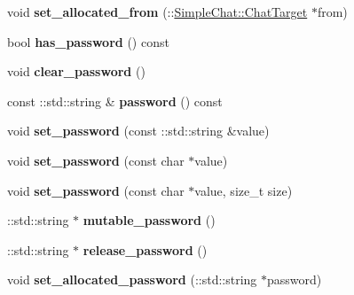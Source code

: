 \begin{DoxyCompactItemize}
\item 
\hypertarget{classSimpleChat_1_1ChatAuthorize_a6fbbc89d79068159644f157b15eeaa37}{void {\bfseries set\-\_\-allocated\-\_\-from} (\-::\hyperlink{classSimpleChat_1_1ChatTarget}{Simple\-Chat\-::\-Chat\-Target} $\ast$from)}\label{classSimpleChat_1_1ChatAuthorize_a6fbbc89d79068159644f157b15eeaa37}

\item 
\hypertarget{classSimpleChat_1_1ChatAuthorize_a5a831a5ec05ba2111daad19523cab731}{bool {\bfseries has\-\_\-password} () const }\label{classSimpleChat_1_1ChatAuthorize_a5a831a5ec05ba2111daad19523cab731}

\item 
\hypertarget{classSimpleChat_1_1ChatAuthorize_acd5a80ea6900f8dc3a8665e155b09d87}{void {\bfseries clear\-\_\-password} ()}\label{classSimpleChat_1_1ChatAuthorize_acd5a80ea6900f8dc3a8665e155b09d87}

\item 
\hypertarget{classSimpleChat_1_1ChatAuthorize_a8c6b4148752b1f1634cef898ffdb47ef}{const \-::std\-::string \& {\bfseries password} () const }\label{classSimpleChat_1_1ChatAuthorize_a8c6b4148752b1f1634cef898ffdb47ef}

\item 
\hypertarget{classSimpleChat_1_1ChatAuthorize_abd5112e528acd7ebadbe4a1582638f4d}{void {\bfseries set\-\_\-password} (const \-::std\-::string \&value)}\label{classSimpleChat_1_1ChatAuthorize_abd5112e528acd7ebadbe4a1582638f4d}

\item 
\hypertarget{classSimpleChat_1_1ChatAuthorize_a2756e5b59b6f42d2d16d621bc6d0414b}{void {\bfseries set\-\_\-password} (const char $\ast$value)}\label{classSimpleChat_1_1ChatAuthorize_a2756e5b59b6f42d2d16d621bc6d0414b}

\item 
\hypertarget{classSimpleChat_1_1ChatAuthorize_aaa5d3d2838522bf1be1bcc2f341196f5}{void {\bfseries set\-\_\-password} (const char $\ast$value, size\-\_\-t size)}\label{classSimpleChat_1_1ChatAuthorize_aaa5d3d2838522bf1be1bcc2f341196f5}

\item 
\hypertarget{classSimpleChat_1_1ChatAuthorize_a388caaa541281ef4444d575b152b603d}{\-::std\-::string $\ast$ {\bfseries mutable\-\_\-password} ()}\label{classSimpleChat_1_1ChatAuthorize_a388caaa541281ef4444d575b152b603d}

\item 
\hypertarget{classSimpleChat_1_1ChatAuthorize_a52ce150b76009f5ac35cf1ef1fd456e1}{\-::std\-::string $\ast$ {\bfseries release\-\_\-password} ()}\label{classSimpleChat_1_1ChatAuthorize_a52ce150b76009f5ac35cf1ef1fd456e1}

\item 
\hypertarget{classSimpleChat_1_1ChatAuthorize_a631b03ab4c754ef493b9e4360f38881c}{void {\bfseries set\-\_\-allocated\-\_\-password} (\-::std\-::string $\ast$password)}\label{classSimpleChat_1_1ChatAuthorize_a631b03ab4c754ef493b9e4360f38881c}

\end{DoxyCompactItemize}
